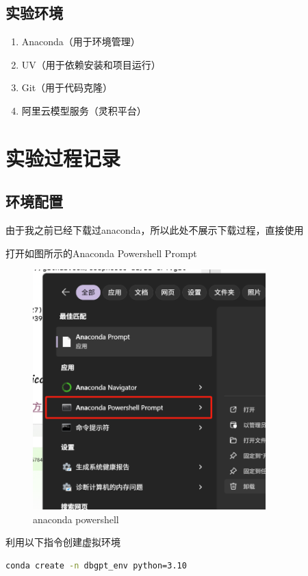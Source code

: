 \documentclass{article}
\begin{document}
	\subsection{实验环境}
	
	\begin{enumerate}[noitemsep, label={{\arabic*})}]
		\item Anaconda（用于环境管理）
		\item UV（用于依赖安装和项目运行）
		\item Git（用于代码克隆）
		\item 阿里云模型服务（灵积平台）
	\end{enumerate}\textbf{}
	
	\section{实验过程记录}
	
	\subsection{环境配置}
	
	由于我之前已经下载过anaconda，所以此处不展示下载过程，直接使用
	
	打开如图所示的Anaconda Powershell Prompt
	
	\begin{figure}[H]
		\centering
		\includegraphics[width=9cm]{./images/1.anaconda powershell.png}
		\caption{anaconda powershell}
	\end{figure}
	
	利用以下指令创建虚拟环境
	
	\begin{lstlisting}[language=bash, title=创建虚拟环境, tabsize=4]
	conda create -n dbgpt_env python=3.10
	\end{lstlisting}
	
\end{document}
